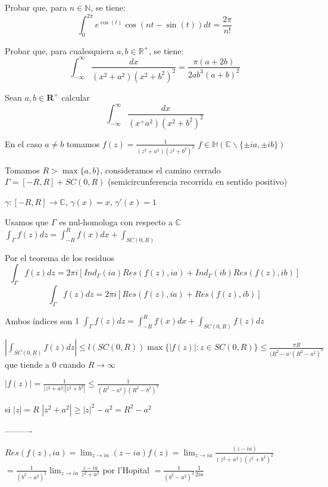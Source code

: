 \begin{ejer}
	Probar que, para $n\in\mathbb{N}$, se tiene:
	$$ \int_{0}^{2\pi} e^{\cos(t)} \cos(nt-\sin(t))dt = \frac{2\pi}{n!} $$
\end{ejer}


\begin{ejer}
	Probar que, para cualesquiera $a,b\in\mathbb{R}^+$, se tiene:
	$$ \int_{-\infty}^{\infty} \frac{dx}{(x^2+a^2)(x^2+b^2)^2} = \frac{\pi (a+2b)}{2ab^3(a+b)^2} $$
\end{ejer}
\begin{sol}
Sean $a,b\in\mathbf{R}^+$ calcular
$$ \int_{-\infty}^{\infty} \frac{dx}{(x^+a^2)(x^2+b^2)^2} $$


En el caso $a\not = b$ tomamos $f(z) = \frac{1}{(z^2+a^2)(z^2+b^2)^2}$
$f\in\mathbb{H}( \mathbb{C}\backslash\{ \pm ia, \pm ib \} )$

Tomamos $R>\max\{a,b\}$, consideramos el camino cerrado $\Gamma = [-R,R]+SC(0,R)$ (semicircunferencia recorrida en sentido positivo)

$\gamma : [-R,R]\rightarrow \mathbb{C}$, $\gamma(x)=x$, $\gamma '(x) = 1$

Usamos que $\Gamma$ es nul-homologa con respecto a $\mathbb{C}$
$\int_{\Gamma}f(z)dz = \int_{-R}^{R} f(x)dx + \int_{SC(0,R)}$

Por el teorema de los residuos 
$$\int_{\Gamma}f(z)dz = 2\pi i [ Ind_{\Gamma}(ia)Res(f(z),ia) + Ind_{\Gamma}(ib)Res(f(z),ib) ]$$
$$\int_{\Gamma}f(z)dz = 2\pi i [Res(f(z),ia) + Res(f(z),ib) ]$$

Ambos índices son $1$
$\int_{\Gamma}f(z)dz = \int_{-R}^{R} f(x)dx + \int_{SC(0,R)} f(z)dz$


$|\int_{SC(0,R)} f(z)dz| \leq l(SC(0,R))\max \{ |f(z)| : z\in SC(0,R) \} \leq \frac{\pi R}{(R^2-a^)(R^2-a^2)^2}$
que tiende a $0$ cuando $R\rightarrow \infty$

$|f(z)| = \frac{1}{|z^2+a^2||z^2+b^2|} \leq \frac{1}{(R^2-a^2)(R^2-b^2)^2}$

si $|z|=R$
$|z^2+a^2| \geq |z|^2 -a^2 = R^2-a^2$

----------

$Res(f(z),ia) = \lim_{z\rightarrow ia} (z-ia)f(z) = \lim_{z\rightarrow ia} \frac{(z-ia)}{(z^2+a^2)(z^2+b^2)^2} $
$= \frac{1}{(b^2-a^2)^2} \lim_{z\rightarrow ia} \frac{z-ia}{z^2+a^2}$ 
por l'Hopital
$= \frac{1}{(b^2-a^2)^2}\frac{1}{2ia}$


\end{sol}
